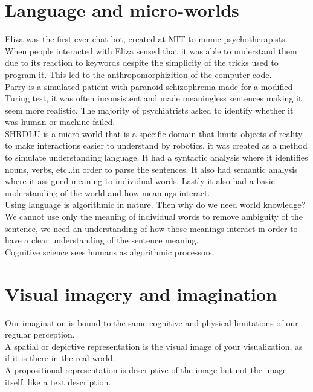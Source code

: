 \documentclass[11pt]{article}
\begin{document}
	\thispagestyle{empty}
	\tableofcontents
	
	\setcounter{page}{1}
	\newpage
	\section{Language and micro-worlds}
	Eliza was the first ever chat-bot, created at MIT to mimic psychotherapists.\\
	When people interacted with Eliza sensed that it was able to understand them due to its reaction to keywords despite the simplicity of the tricks used to program it. This led to the anthropomorphizition of the computer code.\\
	Parry is a simulated patient with paranoid schizophrenia made for a modified Turing test, it was often inconsistent and made meaningless sentences making it seem more realistic. The majority of psychiatrists asked to identify whether it was human or machine failed.\\
	SHRDLU is a micro-world that is a specific domain that limits objects of reality to make interactions easier to understand by robotics, it was created as a method to simulate understanding language. It had a syntactic analysis where it identifies nouns, verbs, etc\dots in order to parse the sentences. It also had semantic analysis where it assigned meaning to individual words. Lastly it also had a basic understanding of the world and how meanings interact.\\
	Using language is algorithmic in nature. Then why do we need world knowledge?\\
	We cannot use only the meaning of individual words to remove ambiguity of the sentence, we need an understanding of how those meanings interact in order to have a clear understanding of the sentence meaning.\\
	Cognitive science sees humans as algorithmic processors.\\
	
	\section{Visual imagery and imagination}
	Our imagination is bound to the same cognitive and physical limitations of our regular perception.\\
	A spatial or depictive representation is the visual image of your visualization, as if it is there in the real world.\\
	A propositional representation is descriptive of the image but not the image itself, like a text description.
	\newpage
\end{document}
